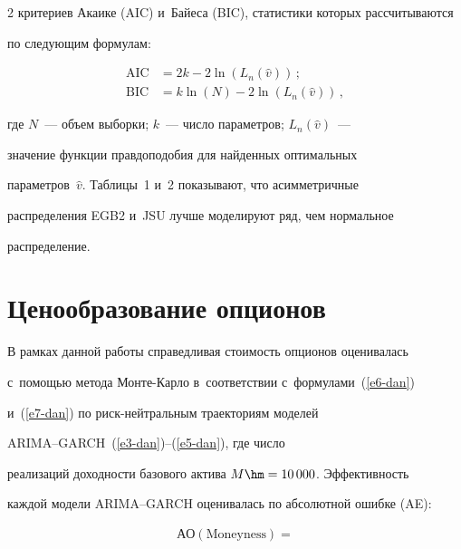 \begin{multicols}{2}
критериев Акаике (AIC) и~Байеса (BIC), статистики которых рассчитываются 


по следующим формулам:





\noindent


  \begin{align*}


    \mathrm{AIC} &= 2k-2\ln\left( L_n\!\left( \hat{v}\right)\right)\,;\\[6pt]


  \mathrm{BIC} &= k\ln(N) -2\ln\left( L_n\!\left( \hat{v}\right)\right)\,,




  \end{align*}


где $N$~--- объем выборки; $k$~--- число параметров; $L_n(\hat{v})$~--- 


значение функции правдоподобия для найден\-ных оптимальных 


параметров~$\hat{v}$. Таблицы~1 и~2 показывают, что асимметричные 


распределения EGB2 и~JSU лучше моделируют ряд, чем нормальное 


распределение.








\section{Ценообразование опционов}





  В рамках данной работы справедливая стоимость опционов оценивалась 


  с~помощью метода Мон\-те-Кар\-ло в~соответствии с~формулами~(\ref{e6-dan}) 


и~(\ref{e7-dan}) по риск-ней\-т\-раль\-ным траекториям моделей  


ARIMA--GARCH~(\ref{e3-dan})--(\ref{e5-dan}), где число 


реализаций доходности базового актива $M\hm= 10\,000$. Эффективность 


каждой модели ARIMA--GARCH оценивалась по абсолютной ошибке (AE):


  \begin{multline*}


  \mathrm{АО}(\mathrm{Moneyness})={}\\



\end{multline*}
\end{multicols}
